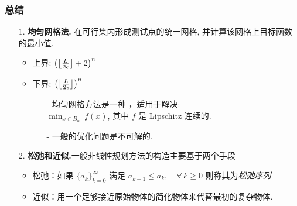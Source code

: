 \documentclass[handout]{beamer}
\begin{document}
\begin{frame}[allowframebreaks]
\frametitle{总结}

\begin{itemize}
    \item[1.]\textbf{均匀网格法.} 在可行集内形成测试点的统一网格,
  并计算该网格上目标函数的最小值.

\begin{itemize}

\item    上界: $ \left( \big{\lfloor}\frac{L}{2\epsilon} \big{\rfloor} +2 \right)_{}^n$
\item  下界: $ \left( \big{\lfloor}\frac{L}{2\epsilon} \big{\rfloor} \right)_{}^n $


  \begin{itemize}
  \item[-] 均匀网格方法是一种 ，适用于解决: \\
     $\min_{x\in B_n}^{}\ f(x)$, 其中 $f$ 是 Lipschitz 连续的.
  \item[-] 一般的优化问题是不可解的.
  \end{itemize}

\end{itemize}

\item[2.] \textbf{松弛和近似.}一般非线性规划方法的构造主要基于两个手段

\begin{itemize}
    \item 松弛：如果 $\{a_k^{}\}_{k=0}^{\infty}$ 满足 
    $a_{k+1}^{}\leq  a_k,\quad \forall\, k\geq 0$
    则称其为\textit{松弛序列}
    \item 近似：用一个足够接近原始物体的简化物体来代替最初的复杂物体.
\end{itemize}

\end{itemize}

\end{frame}
\end{document}
